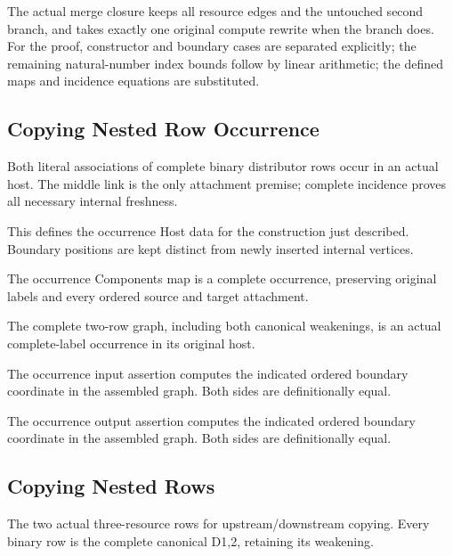 The actual merge closure keeps all resource edges and the untouched second branch, and takes exactly one original compute rewrite when the branch does.
For the proof, constructor and boundary cases are separated explicitly; the remaining natural-number index bounds follow by linear arithmetic; the defined maps and incidence equations are substituted.
\par{}

\subsection{Copying Nested Row Occurrence}
Both literal associations of complete binary distributor rows occur in an actual host. The middle link is the only attachment premise; complete incidence proves all necessary internal freshness.

This defines the occurrence Host data for the construction just described. Boundary positions are kept distinct from newly inserted internal vertices.
\par{}

The occurrence Components map is a complete occurrence, preserving original labels and every ordered source and target attachment.
\par{}

The complete two-row graph, including both canonical weakenings, is an actual complete-label occurrence in its original host.
\par{}

The occurrence input assertion computes the indicated ordered boundary coordinate in the assembled graph.
Both sides are definitionally equal.
\par{}

The occurrence output assertion computes the indicated ordered boundary coordinate in the assembled graph.
Both sides are definitionally equal.
\par{}

\subsection{Copying Nested Rows}
The two actual three-resource rows for upstream/downstream copying. Every binary row is the complete canonical D1,2, retaining its weakening.


